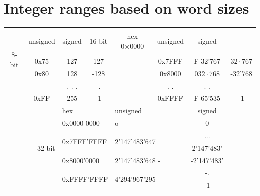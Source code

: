 \section*{Integer ranges based on word sizes}
\begin{center}
\begin{tabular}{|c|c|c|c|c|c|c|c|}
\hline
\multirow[t]{6}{*}{8-bit} & \( \begin{gathered} \text { hex } \\ 0 \times 00 \end{gathered} \) & unsigned & signed & 16-bit & hex 0×0000 & unsigned & signed \\
\hline
 &  &  &  &  &  &  &  \\
\hline
 & 0x75 & 127 & 127 &  & 0x7FFF & F 32'767 & $32 \cdot 767$ \\
\hline
 & 0x80 & 128 & -128 &  & 0x8000 & $032 \cdot 768$ & -32'768 \\
\hline
 &  & . . . & -. &  & . . & . . &  \\
\hline
 & 0xFF & 255 & -1 &  & 0xFFFF & F 65'535 & -1 \\
\hline
\multicolumn{2}{|r|}{\multirow[t]{7}{*}{32-bit}} & \multicolumn{2}{|l|}{hex} & \multicolumn{2}{|l|}{unsigned} & signed &  \\
\hline
 &  & \multicolumn{2}{|l|}{0x0000 0000} & \multicolumn{2}{|l|}{o} & 0 &  \\
\hline
 &  & \multicolumn{2}{|l|}{\multirow[t]{2}{*}{0x7FFF'FFFF}} & \multicolumn{2}{|l|}{\multirow[t]{2}{*}{2'147'483'647}} & ... &  \\
\hline
 &  &  &  &  &  & 2'147'483' &  \\
\hline
 &  & \multicolumn{2}{|l|}{0x8000'0000} & \multicolumn{2}{|l|}{2'147'483'648 -} & -2'147'483' &  \\
\hline
 &  & \multicolumn{2}{|l|}{\multirow[t]{2}{*}{0xFFFF'FFFF}} & \multicolumn{2}{|l|}{\multirow[t]{2}{*}{4'294'967'295}} & -. &  \\
\hline
 &  &  &  &  &  & -1 &  \\
\hline
\end{tabular}
\end{center}